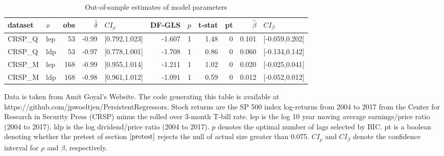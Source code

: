 \documentclass[11pt, a4paper]{article}
\begin{document}
\begin{table}[h!]
\small
\setlength\tabcolsep{5.3pt}
\centering
\caption{Out-of-sample estimates of model parameters}
\label{tab:oos}
\begin{threeparttable}
\begin{tabular}{llrrlrrrrrl}
  \hline
dataset & $x$ & obs & $\hat{\delta}$ & $CI_{\rho}$ & DF-GLS & $p$ &t-stat & pt & $\hat{\beta}$ & $CI_{\beta}$ \\ 
  \hline
  CRSP\_Q  & lep & 53 & -0.99 & [0.792,1.023] & -1.607 & 1 & 1.48 & 0 & 0.101 & [-0.059,0.202] \\ 
  CRSP\_Q & ldp & 53 & -0.97 & [0.778,1.001] & -1.708 & 1 & 0.86 & 0 & 0.060 & [-0.134,0.142] \\ 
  CRSP\_M & lep & 168 & -0.99 & [0.955,1.014] & -1.211 & 1 & 1.02 & 0 & 0.020 & [-0.025,0.041] \\ 
  CRSP\_M & ldp & 168 & -0.98 & [0.961,1.012] & -1.091 & 1 & 0.59 & 0 & 0.012 & [-0.052,0.012] \\ 
\hline
\end{tabular}
 \begin{tablenotes}
 \small
\item Data is taken from Amit Goyal’s Website. The code generating this table is available at https://github.com/jpwoeltjen/PersistentRegressors. Stock returns are the SP 500 index log-returns from 2004 to 2017 from the Center for Research in Security Press (CRSP) minus the rolled over 3-month T-bill rate. lep is the log 10 year moving average earnings/price ratio (2004 to 2017). ldp is the log dividend/price ratio (2004 to 2017).
$p$ denotes the optimal number of lags selected by BIC. pt is a boolean denoting whether the pretest of section $\ref{pretest}$ rejects the null of actual size greater than 0.075. $CI_{\rho}$ and $CI_{\beta}$ denote the confidence interval for $\rho$ and $\beta$, respectively.
\end{tablenotes}
\end{threeparttable}
\end{table}
\end{document}
